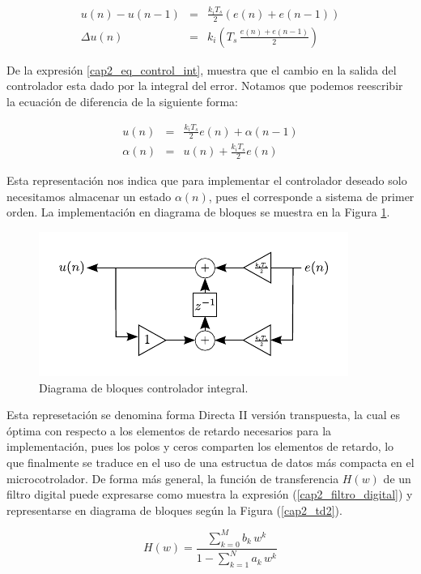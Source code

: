 \begin{eqnarray}
u(n)- u(n-1) &=&  \frac{k_i T_s}{2}(e(n)+e(n-1)) \\
\Delta u(n) &=& k_i \left( T_s \, \frac{e(n)+e(n-1)}{2} \right) \label{cap2_eq_control_int}
\end{eqnarray}

De la expresión \ref{cap2_eq_control_int}, muestra que el cambio en la salida del controlador esta dado por la integral del error. Notamos que podemos reescribir la ecuación de diferencia de la siguiente forma:

\begin{eqnarray}
u(n) &=&  \frac{k_i T_s}{2} e(n) + \alpha(n-1) \\
\alpha(n) &=& u(n) + \frac{k_i T_s}{2} e(n)
\end{eqnarray}

Esta representación nos indica que para implementar el controlador deseado solo necesitamos almacenar un estado $\alpha(n)$, pues el corresponde a sistema de primer orden. La implementación en diagrama de bloques se muestra en la Figura \ref{cap2_block_integral}.

\begin{figure}[H]
  \centering
  \includegraphics[scale=1.5]{img/cap2/block_pi}
  \caption{Diagrama de bloques controlador integral.}
  \label{cap2_block_integral}
\end{figure}

Esta represetación se denomina forma Directa II versión transpuesta, la cual es óptima con respecto a los elementos de retardo necesarios para la implementación, pues los polos y ceros comparten los elementos de retardo, lo que finalmente se traduce en el uso de una estructua de datos más compacta en el microcotrolador. De forma más general, la función de transferencia $H(w)$ de un filtro digital puede expresarse como muestra la expresión (\ref{cap2_filtro_digital}) y representarse en diagrama de bloques según la Figura (\ref{cap2_td2}).

\begin{equation}
H(w) = \frac{\sum_{k=0}^{M} b_k \, w^k}{1-\sum_{k=1}^{N} a_k \, w^k}\label{cap2_filtro_digital}
\end{equation}

